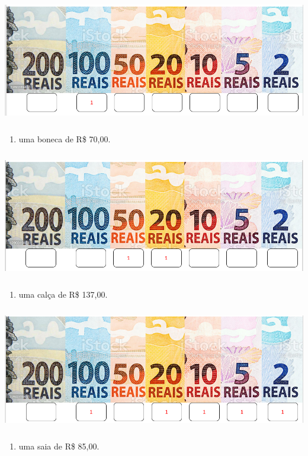\includegraphics[width=5.90556in,height=2.19028in]{media/image65.png}

\begin{enumerate}
\def\labelenumi{\Alph{enumi})}
\item
  uma boneca de R\$ 70,00.
\end{enumerate}

\includegraphics[width=5.90556in,height=2.18611in]{media/image66.png}

\begin{enumerate}
\def\labelenumi{\Alph{enumi})}
\item
  uma calça de R\$ 137,00.
\end{enumerate}

\includegraphics[width=5.90556in,height=2.12778in]{media/image67.png}

\begin{enumerate}
\def\labelenumi{\Alph{enumi})}
\item
  uma saia de R\$ 85,00.
\end{enumerate}

